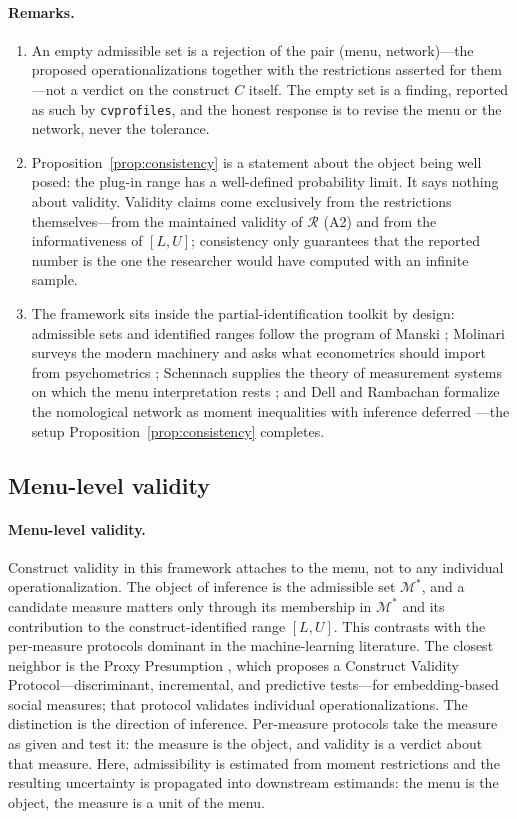 \documentclass[10pt,letterpaper]{article}
\newcommand{\cvp}{\texttt{cvprofiles}}
\newcommand{\M}{\ensuremath{\mathcal{M}}}
\begin{document}
\paragraph{Remarks.}
\begin{enumerate}
\item An empty admissible set is a rejection of the pair (menu, network)---the proposed operationalizations together with the restrictions asserted for them---not a verdict on the construct $C$ itself. The empty set is a finding, reported as such by \cvp{}, and the honest response is to revise the menu or the network, never the tolerance.
\item Proposition~\ref{prop:consistency} is a statement about the object being well posed: the plug-in range has a well-defined probability limit. It says nothing about validity. Validity claims come exclusively from the restrictions themselves---from the maintained validity of $\mathcal{R}$ (A2) and from the informativeness of $[L,U]$; consistency only guarantees that the reported number is the one the researcher would have computed with an infinite sample.
\item The framework sits inside the partial-identification toolkit by design: admissible sets and identified ranges follow the program of Manski \cite{manski2003}; Molinari surveys the modern machinery and asks what econometrics should import from psychometrics \cite{molinari2020}; Schennach supplies the theory of measurement systems on which the menu interpretation rests \cite{schennach2021}; and Dell and Rambachan formalize the nomological network as moment inequalities with inference deferred \cite{dellrambachan2026}---the setup Proposition~\ref{prop:consistency} completes.
\end{enumerate}

\subsection{Menu-level validity}

\paragraph{Menu-level validity.}
Construct validity in this framework attaches to the menu, not to any individual operationalization. The object of inference is the admissible set $\M^*$, and a candidate measure matters only through its membership in $\M^*$ and its contribution to the construct-identified range $[L,U]$. This contrasts with the per-measure protocols dominant in the machine-learning literature. The closest neighbor is the Proxy Presumption \cite{proxy2026}, which proposes a Construct Validity Protocol---discriminant, incremental, and predictive tests---for embedding-based social measures; that protocol validates individual operationalizations. The distinction is the direction of inference. Per-measure protocols take the measure as given and test it: the measure is the object, and validity is a verdict about that measure. Here, admissibility is estimated from moment restrictions and the resulting uncertainty is propagated into downstream estimands: the menu is the object, the measure is a unit of the menu.
\end{document}
